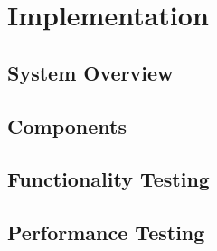 \chapter{Implementation}
\section{System Overview}

\section{Components}

\section{Functionality Testing}

\section{Performance Testing}
